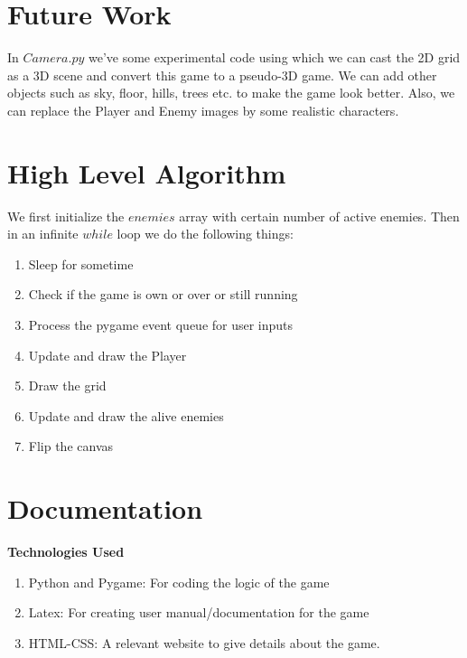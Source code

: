 \documentclass{article}
\begin{document}
\section{Future Work}
In $Camera.py$ we've some experimental code using which we can cast the 2D grid as a 3D scene and convert this game to a pseudo-3D game. We can add other objects such as sky, floor, hills, trees etc. to make the game look better. Also, we can replace the Player and Enemy images by some realistic characters.

\section{High Level Algorithm}

We first initialize the $enemies$ array with certain number of active enemies. Then in an infinite $while$ loop we do the following things:
\begin{enumerate}
	\item Sleep for sometime
	\item Check if the game is own or over or still running
	\item Process the pygame event queue for user inputs
	\item Update and draw the Player
	\item Draw the grid
	\item Update and draw the alive enemies
	\item Flip the canvas
\end{enumerate}


\section{Documentation}
\textbf{Technologies Used}
\begin{enumerate}
	\item Python and Pygame: For coding the logic of the game
	\item Latex: For creating user manual/documentation for the game
	\item HTML-CSS: A relevant website to give details about the game.
\end{enumerate}
\end{document}
